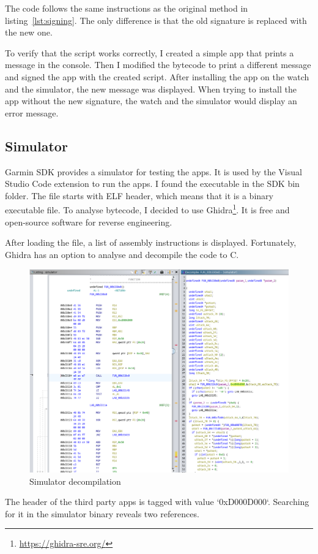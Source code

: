 The code follows the same instructions as the original method in listing~\ref{lst:signing}.
The only difference is that the old signature is replaced with the new one.

To verify that the script works correctly, I created a simple app that prints a message in the console.
Then I modified the bytecode to print a different message and signed the app with the created script.
After installing the app on the watch and the simulator, the new message was displayed.
When trying to install the app without the new signature, the watch and the simulator would display an error message.

\subsection{Simulator}
Garmin SDK provides a simulator for testing the apps.
It is used by the Visual Studio Code extension to run the apps.
I found the executable in the SDK bin folder.
The file starts with ELF header, which means that it is a binary executable file.
To analyse bytecode, I decided to use Ghidra\footnote{\url{https://ghidra-sre.org/}}.
It is free and open-source software for reverse engineering.

After loading the file, a list of assembly instructions is displayed.
Fortunately, Ghidra has an option to analyse and decompile the code to C\@.

\begin{figure}[h]
    \centering
    \includegraphics[width=0.7\linewidth]{../../images/ghidra}
    \caption{Simulator decompilation}
    \label{fig:concept}
\end{figure}

The header of the third party apps is tagged with value `0xD000D000`\cite{broken-vm}.
Searching for it in the simulator binary reveals two references.


